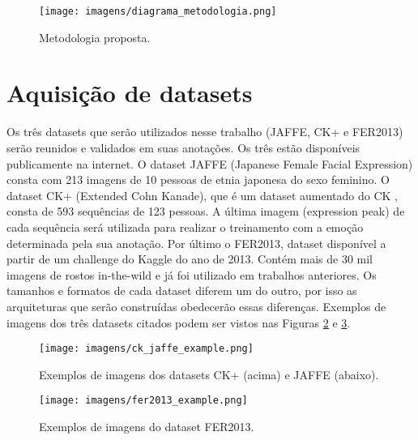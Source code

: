 \documentclass[
12pt,				%
openright,			%
oneside,			%
a4paper,			%
english,			%
french,				%
spanish,			%
brazil				%
]{abntex2}
\begin{document}
\begin{figure}[ht]
\centering
\caption{Metodologia proposta.}
\texttt{[image: imagens/diagrama\_metodologia.png]}
\label{fig:diagrama_metodologia}
\end{figure}


\section{Aquisição de datasets}

Os três datasets que serão utilizados nesse trabalho (JAFFE, CK+ e FER2013) serão reunidos e validados em suas anotações. Os três estão disponíveis publicamente na internet. O dataset JAFFE (Japanese Female Facial Expression) consta com 213 imagens de 10 pessoas de etnia japonesa do sexo feminino. O dataset CK+ (Extended Cohn Kanade), que é um dataset aumentado do CK \cite{kanade2000comprehensive}, consta de 593 sequências de 123 pessoas. A última imagem (expression peak) de cada sequência será utilizada para realizar o treinamento com a emoção determinada pela sua anotação. Por último o FER2013, dataset disponível a partir de um challenge do Kaggle \cite{kaggle} do ano de 2013. Contém mais de 30 mil imagens de rostos in-the-wild e já foi utilizado em trabalhos anteriores. Os tamanhos e formatos de cada dataset diferem um do outro, por isso as arquiteturas que serão construídas obedecerão essas diferenças. Exemplos de imagens dos três datasets citados podem ser vistos nas Figuras \ref{fig:ck_jaffe} e \ref{fig:fer2013}.

\begin{figure}[ht]
\centering
\caption{Exemplos de imagens dos datasets CK+ (acima) e JAFFE (abaixo).}
\texttt{[image: imagens/ck\_jaffe\_example.png]}
\label{fig:ck_jaffe}
\end{figure}

\begin{figure}[ht]
\centering
\caption{Exemplos de imagens do dataset FER2013.}
\texttt{[image: imagens/fer2013\_example.png]}
\label{fig:fer2013}
\end{figure}

\end{document}
